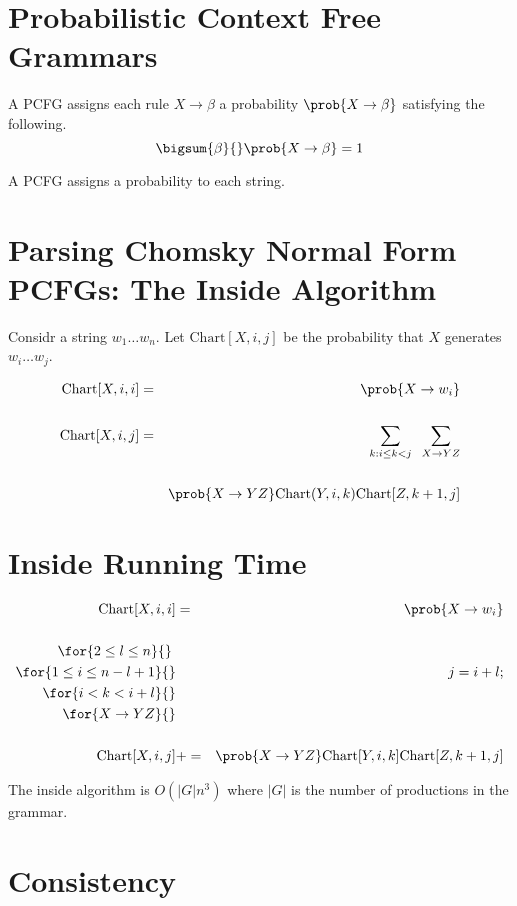 \section{Probabilistic Context Free Grammars}

A PCFG assigns each rule $X \rightarrow \beta$ a probability $\prob{X \rightarrow \beta}$
satisfying the following.
$$\bigsum{\beta}{}  \prob{X \rightarrow \beta} = 1$$


A PCFG assigns a probability to each string.

\section{Parsing Chomsky Normal Form PCFGs: The Inside Algorithm}
Considr a string $w_1\ldots w_n$.
Let $\mathrm{Chart}[X,i,j]$ be the probability that $X$ generates $w_i\ldots w_j$.

\begin{eqnarray*}
\mathrm{Chart}[X,i,i] & = & \prob{X \rightarrow w_i}
\\
\\
\mathrm{Chart}[X,i,j] & = & \sum_{k: i \leq k < j} \;\;\sum_{X \rightarrow YZ}
\\
\\
 & & \prob{X\rightarrow YZ}\mathrm{Chart}(Y,i,k)\mathrm{Chart}[Z,k+1,j]
\end{eqnarray*}

\section{Inside Running Time}
\begin{eqnarray*}
\mathrm{Chart}[X,i,i] & = & \prob{X \rightarrow w_i}  \\ \\
\for{2 \leq l \leq n}{}\; \\
\for{1 \leq i \leq n-l+1}{} & & \;j = i+l; \\
\for{i<k<i+l}{} \\
\for{X\rightarrow YZ}{} \\ \\
\;\;\mathrm{Chart}[X,i,j] & += & \prob{X\rightarrow YZ}\mathrm{Chart}[Y,i,k]\mathrm{Chart}[Z,k+1,j]
\end{eqnarray*}


The inside algorithm is $O(|G|n^3)$ where $|G|$ is the number of productions in the grammar.

\section{Consistency}

